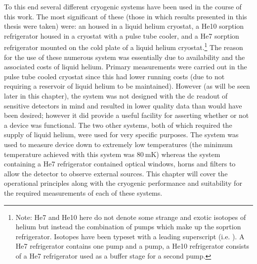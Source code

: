 To this end several different cryogenic systems have been used in the course of this work. The most significant of these (those in which results presented in this thesis were taken) were: an  housed in a liquid helium cryostat, a He10 sorption refrigerator housed in a cryostat with a pulse tube cooler, and a He7 sorption refrigerator mounted on the cold plate of a liquid helium cryostat.\footnote{Note: He7 and He10 here do not denote some strange and exotic isotopes of helium but instead the combination of pumps which make up the soprtion refrigerator. Isotopes have been typeset with a leading superscript (i.e. ). A He7 refrigerator contains one  pump and a  pump, a He10 refrigerator consists of a He7 refrigerator used as a buffer stage for a second  pump.} The reason for the use of these numerous system was essentially due to availability and the associated costs of liquid helium. Primary measurements were carried out in the pulse tube cooled cryostat since this had lower running costs (due to not requiring a reservoir of liquid helium to be maintained). However (as will be seen later in this chapter), the system was not designed with the dc readout of sensitive detectors in mind and resulted in lower quality data than would have been desired; however it did provide a useful facility for asserting whether or not a device was functional. The two other systems, both of which required the supply of liquid helium, were used for very specific purposes. The  system was used to measure device down to extremely low temperatures (the minimum temperature achieved with this system was $80~\mathrm{mK}$) whereas the system containing a He7 refrigerator contained optical windows, horns and filters to allow the detector to observe external sources. This chapter will cover the operational principles along with the cryogenic performance and suitability for the required measurements of each of these systems.
%

